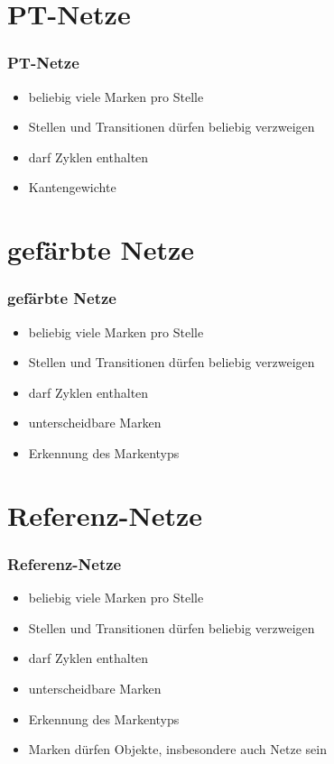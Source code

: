 \section{PT-Netze}

\begin{frame}
	\frametitle{PT-Netze}
	
	\begin{itemize}
		\item beliebig viele Marken pro Stelle
		\item Stellen und Transitionen dürfen beliebig verzweigen
		\item darf Zyklen enthalten
		\item Kantengewichte
	\end{itemize}
	
\end{frame}



\section{gefärbte Netze}

\begin{frame}
	\frametitle{gefärbte Netze}
	
	\begin{itemize}
		\item beliebig viele Marken pro Stelle
		\item Stellen und Transitionen dürfen beliebig verzweigen
		\item darf Zyklen enthalten
		\item unterscheidbare Marken
		\item Erkennung des Markentyps
	\end{itemize}
	
\end{frame}

\section{Referenz-Netze}

\begin{frame}
	\frametitle{Referenz-Netze}
	
	\begin{itemize}
		\item beliebig viele Marken pro Stelle
		\item Stellen und Transitionen dürfen beliebig verzweigen
		\item darf Zyklen enthalten
		\item unterscheidbare Marken
		\item Erkennung des Markentyps
		\item Marken dürfen Objekte, insbesondere auch Netze sein
	\end{itemize}
	
\end{frame}

